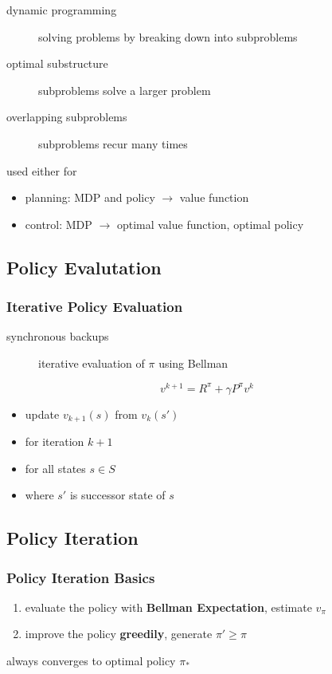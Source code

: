 \documentclass[]{article}
\theoremstyle{definition}
\begin{document}
\begin{description}
    \item[dynamic programming] solving problems by breaking down into subproblems
    \item [optimal substructure] subproblems solve a larger problem
    \item [overlapping subproblems] subproblems recur many times
\end{description}

used either for
\begin{itemize}
    \item planning: MDP and policy $\to$ value function
    \item control: MDP $\to$ optimal value function, optimal policy
\end{itemize}

\subsection{Policy Evalutation}
\label{sub:policy_evalutation}

\subsubsection{Iterative Policy Evaluation}
\label{ssub:someting}

\begin{description}
    \item[synchronous backups] iterative evaluation of $\pi$ using Bellman
\end{description}
\begin{equation*}
    v^{k+1} = R^\pi + \gamma P^\pi v^k
\end{equation*}
\begin{itemize}
    \item update $v_{k+1}(s)$ from $v_k(s')$
    \item for iteration $k+1$
    \item for all states $s \in S$
    \item where $s'$ is successor state of $s$
\end{itemize}


\subsection{Policy Iteration}
\label{sec:policy_iteration}

\subsubsection{Policy Iteration Basics}%
\label{ssub:policy_iteration_basics}
\begin{enumerate}
    \item evaluate the policy with \textbf{Bellman Expectation}, estimate $v_\pi$
    \item improve the policy \textbf{greedily}, generate $\pi' \geq \pi$
\end{enumerate}
always converges to optimal policy $\pi_*$
\end{document}
